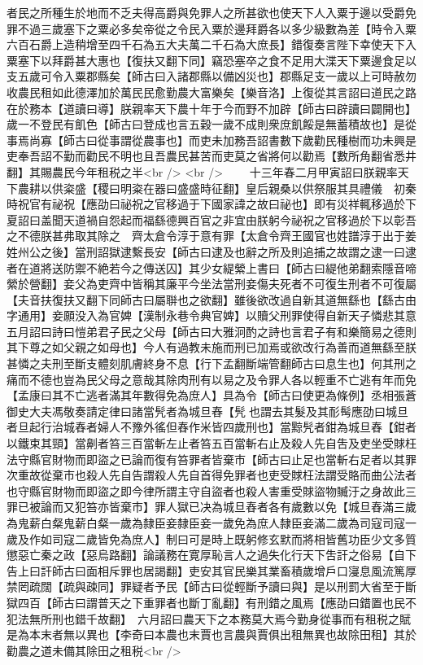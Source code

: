 者民之所種生於地而不乏夫得高爵與免罪人之所甚欲也使天下人入粟于邊以受爵免罪不過三歲塞下之粟必多矣帝從之令民入粟於邊拜爵各以多少級數為差【時令入粟六百石爵上造稍增至四千石為五大夫萬二千石為大庶長】錯復奏言陛下幸使天下入粟塞下以拜爵甚大惠也【復扶又翻下同】竊恐塞卒之食不足用大渫天下粟邊食足以支五歲可令入粟郡縣矣【師古曰入諸郡縣以備凶災也】郡縣足支一歲以上可時赦勿收農民租如此德澤加於萬民民愈勤農大富樂矣【樂音洛】上復從其言詔曰道民之路在於務本【道讀曰導】朕親率天下農十年于今而野不加辟【師古曰辟讀曰闢開也】歲一不登民有飢色【師古曰登成也言五穀一歲不成則衆庶飢餒是無蓄積故也】是從事焉尚寡【師古曰從事謂從農事也】而吏未加務吾詔書數下歲勸民種樹而功未興是吏奉吾詔不勤而勸民不明也且吾農民甚苦而吏莫之省將何以勸焉【數所角翻省悉井翻】其賜農民今年租税之半<br />
<br />
　　十三年春二月甲寅詔曰朕親率天下農耕以供粢盛【稷曰明粢在器曰盛盛時征翻】皇后親桑以供祭服其具禮儀　初秦時祝官有祕祝【應劭曰祕祝之官移過于下國家諱之故曰祕也】即有災祥輒移過於下夏詔曰盖聞天道禍自怨起而福繇德興百官之非宜由朕躬今祕祝之官移過於下以彰吾之不德朕甚弗取其除之　齊太倉令淳于意有罪【太倉令齊王國官也姓譜淳于出于姜姓州公之後】當刑詔獄逮繫長安【師古曰逮及也辭之所及則追捕之故謂之逮一曰逮者在道將送防禦不絶若今之傳送囚】其少女緹縈上書曰【師古曰緹他弟翻索隱音啼縈於營翻】妾父為吏齊中皆稱其廉平今坐法當刑妾傷夫死者不可復生刑者不可復屬【夫音扶復扶又翻下同師古曰屬聨也之欲翻】雖後欲改過自新其道無繇也【繇古由字通用】妾願没入為官婢【漢制永巷令典官婢】以贖父刑罪使得自新天子憐悲其意五月詔曰詩曰愷弟君子民之父母【師古曰大雅泂酌之詩也言君子有和樂簡易之德則其下尊之如父親之如母也】今人有過教未施而刑已加焉或欲改行為善而道無繇至朕甚憐之夫刑至斷支體刻肌膚終身不息【行下孟翻斷端管翻師古曰息生也】何其刑之痛而不德也豈為民父母之意哉其除肉刑有以易之及令罪人各以輕重不亡逃有年而免【孟康曰其不亡逃者滿其年數得免為庶人】具為令【師古曰使更為條例】丞相張蒼御史大夫馮敬奏請定律曰諸當髠者為城旦舂【髠也謂去其髮及其耏髩應劭曰城旦者旦起行治城舂者婦人不豫外徭但舂作米皆四歲刑也】當黥髠者鉗為城旦舂【鉗者以鐵束其頸】當劓者笞三百當斬左止者笞五百當斬右止及殺人先自吿及吏坐受賕枉法守縣官財物而即盜之已論而復有笞罪者皆棄市【師古曰止足也當斬右足者以其罪次重故從棄市也殺人先自告謂殺人先自首得免罪者也吏受賕枉法謂受賂而曲公法者也守縣官財物而即盜之即今律所謂主守自盜者也殺人害重受賕盜物贓汙之身故此三罪已被論而又犯笞亦皆棄市】罪人獄已决為城旦舂者各有歲數以免【城旦舂滿三歲為鬼薪白粲鬼薪白粲一歲為隸臣妾隸臣妾一歲免為庶人隸臣妾滿二歲為司寇司寇一歲及作如司寇二歲皆免為庶人】制曰可是時上既躬修玄默而將相皆舊功臣少文多質懲惡亡秦之政【惡烏路翻】論議務在寛厚恥言人之過失化行天下吿訐之俗易【自下告上曰訐師古曰面相斥罪也居謁翻】吏安其官民樂其業畜積歲增戶口寖息風流篤厚禁罔疏闊【疏與疎同】罪疑者予民【師古曰從輕斷予讀曰與】是以刑罰大省至于斷獄四百【師古曰謂普天之下重罪者也斷丁亂翻】有刑錯之風焉【應劭曰錯置也民不犯法無所刑也錯千故翻】　六月詔曰農天下之本務莫大焉今勤身從事而有租税之賦是為本末者無以異也【李奇曰本農也末賈也言農與賈俱出租無異也故除田租】其於勸農之道未備其除田之租税<br />
